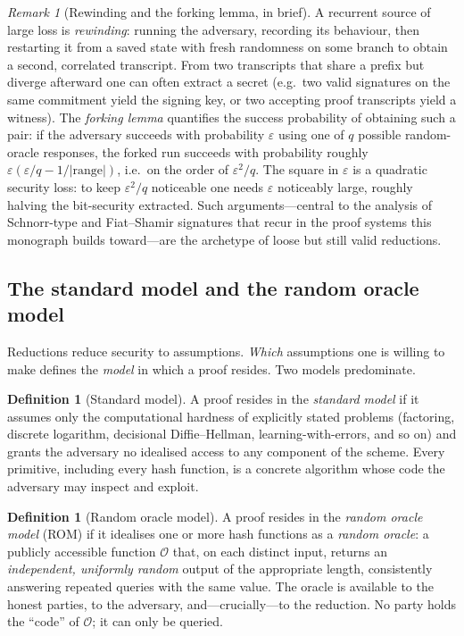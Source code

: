 \documentclass[11pt,a4paper]{article}
\theoremstyle{definition}
\newtheorem{definition}[theorem]{Definition}
\theoremstyle{remark}
\newtheorem{remark}[theorem]{Remark}
\begin{document}
\begin{remark}[Rewinding and the forking lemma, in brief]\label{model:rem:forking}
A recurrent source of large loss is \emph{rewinding}: running the adversary,
recording its behaviour, then restarting it from a saved state with fresh
randomness on some branch to obtain a second, correlated transcript. From two
transcripts that share a prefix but diverge afterward one can often extract a
secret (e.g.\ two valid signatures on the same commitment yield the signing key,
or two accepting proof transcripts yield a witness). The \emph{forking lemma}
quantifies the success probability of obtaining such a pair: if the adversary
succeeds with probability \(\varepsilon\) using one of \(q\) possible random-oracle
responses, the forked run succeeds with probability roughly
\(\varepsilon(\varepsilon/q - 1/|\text{range}|)\), i.e.\ on the order of
\(\varepsilon^2/q\). The square in \(\varepsilon\) is a quadratic security loss:
to keep \(\varepsilon^2/q\) noticeable one needs \(\varepsilon\) noticeably large,
roughly halving the bit-security extracted. Such arguments---central to the
analysis of Schnorr-type and Fiat--Shamir signatures that recur in the proof
systems this monograph builds toward---are the archetype of loose but still
valid reductions.
\end{remark}

\subsection{The standard model and the random oracle model}\label{model:subsec:rom}

Reductions reduce security to assumptions. \emph{Which} assumptions one is
willing to make defines the \emph{model} in which a proof resides. Two models
predominate.

\begin{definition}[Standard model]\label{model:def:standardmodel}
A proof resides in the \emph{standard model} if it assumes only the computational
hardness of explicitly stated problems (factoring, discrete logarithm,
decisional Diffie--Hellman, learning-with-errors, and so on) and grants the
adversary no idealised access to any component of the scheme. Every primitive,
including every hash function, is a concrete algorithm whose code the adversary
may inspect and exploit.
\end{definition}

\begin{definition}[Random oracle model]\label{model:def:rom}
A proof resides in the \emph{random oracle model} (ROM) if it idealises one or more
hash functions as a \emph{random oracle}: a publicly accessible function
\(\mathcal{O}\) that, on each distinct input, returns an \emph{independent,
uniformly random} output of the appropriate length, consistently answering
repeated queries with the same value. The oracle is available to the honest
parties, to the adversary, and---crucially---to the reduction. No party holds
the ``code'' of \(\mathcal{O}\); it can only be queried.
\end{definition}
\end{document}
